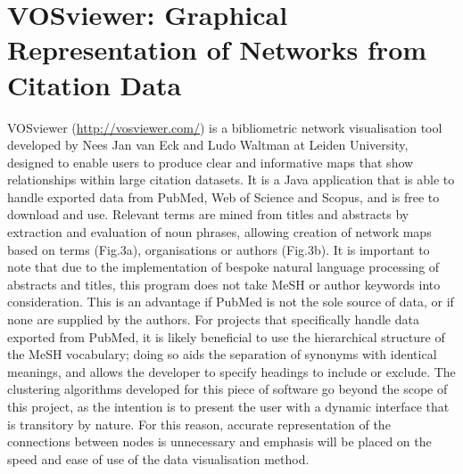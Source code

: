 \documentclass[PROP_AGutteridge_CS.tex]{subfiles}
\begin{document}
\section{VOSviewer: Graphical Representation of Networks from Citation Data}
VOSviewer (\url{http://vosviewer.com/}) is a bibliometric network visualisation tool developed by Nees Jan van Eck and Ludo Waltman at Leiden University, designed to enable users to produce clear and informative maps that show relationships within large citation datasets\cite{eck-waltman2}. It is a Java application that is able to handle exported data from PubMed, Web of Science and Scopus, and is free to download and use. Relevant terms are mined from titles and abstracts by extraction and evaluation of noun phrases\cite{eck-waltman1}, allowing creation of network maps based on terms (Fig.3a), organisations or authors (Fig.3b). It is important to note that due to the implementation of bespoke natural language processing of abstracts and titles, this program does not take MeSH or author keywords into consideration. This is an advantage if PubMed is not the sole source of data, or if none are supplied by the authors. For projects that specifically handle data exported from PubMed, it is likely beneficial to use the hierarchical structure of the MeSH vocabulary; doing so aids the separation of synonyms with identical meanings, and allows the developer to specify headings to include or exclude. The clustering algorithms developed for this piece of software go beyond the scope of this project, as the intention is to present the user with a dynamic interface that is transitory by nature. For this reason, accurate representation of the connections between nodes is unnecessary and emphasis will be placed on the speed and ease of use of the data visualisation method.
\end{document}

